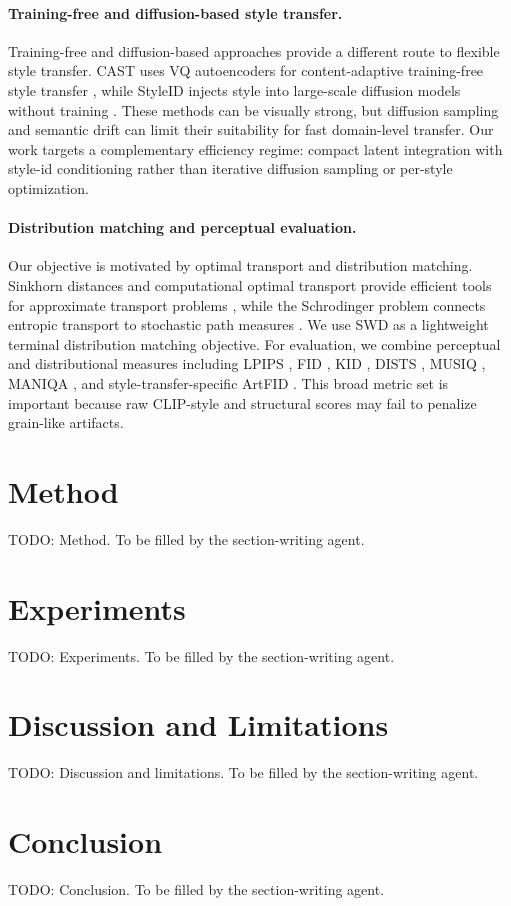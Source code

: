 \documentclass{article}
\begin{document}
\paragraph{Training-free and diffusion-based style transfer.}
Training-free and diffusion-based approaches provide a different route to flexible style transfer. CAST uses VQ autoencoders for content-adaptive training-free style transfer \cite{gim2024cast}, while StyleID injects style into large-scale diffusion models without training \cite{chung2024styleid}. These methods can be visually strong, but diffusion sampling and semantic drift can limit their suitability for fast domain-level transfer. Our work targets a complementary efficiency regime: compact latent integration with style-id conditioning rather than iterative diffusion sampling or per-style optimization.

\paragraph{Distribution matching and perceptual evaluation.}
Our objective is motivated by optimal transport and distribution matching. Sinkhorn distances and computational optimal transport provide efficient tools for approximate transport problems \cite{cuturi2013sinkhorn,peyre2019computational}, while the Schrodinger problem connects entropic transport to stochastic path measures \cite{leonard2014survey}. We use SWD as a lightweight terminal distribution matching objective. For evaluation, we combine perceptual and distributional measures including LPIPS \cite{zhang2018lpips}, FID \cite{heusel2017fid}, KID \cite{binkowski2018kid}, DISTS \cite{ding2020dists}, MUSIQ \cite{ke2021musiq}, MANIQA \cite{yang2022maniqa}, and style-transfer-specific ArtFID \cite{wright2022artfid}. This broad metric set is important because raw CLIP-style and structural scores may fail to penalize grain-like artifacts.

\section{Method}
TODO: Method. To be filled by the section-writing agent.

\section{Experiments}
TODO: Experiments. To be filled by the section-writing agent.

\section{Discussion and Limitations}
TODO: Discussion and limitations. To be filled by the section-writing agent.

\section{Conclusion}
TODO: Conclusion. To be filled by the section-writing agent.



\end{document}
